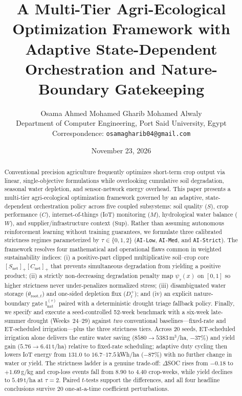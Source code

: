 \documentclass[11pt,a4paper]{article}
\title{\textbf{A Multi-Tier Agri-Ecological Optimization Framework with Adaptive State-Dependent Orchestration and Nature-Boundary Gatekeeping}}
\author{
  Osama Ahmed Mohamed Gharib Mohamed Alwaly\\
  \small Department of Computer Engineering, Port Said University, Egypt\\
  \small Correspondence: \texttt{osamagharib04@gmail.com}
}
\date{November 23, 2026}
\newcommand{\pos}[1]{\left[#1\right]_{+}}
\newcommand{\Inat}{\mathbb{I}_{\mathrm{nat}}}
\begin{document}
\maketitle

\begin{abstract}
Conventional precision agriculture frequently optimizes short-term crop output via linear, single-objective formulations while overlooking cumulative soil degradation, seasonal water depletion, and sensor-network energy overhead. This paper presents a multi-tier agri-ecological optimization framework governed by an adaptive, state-dependent orchestration policy across five coupled subsystems: soil quality ($S$), crop performance ($C$), internet-of-things (IoT) monitoring ($M$), hydrological water balance ($W$), and supplier/infrastructure context ($\mathrm{Sup}$). Rather than assuming autonomous reinforcement learning without training guarantees, we formulate three calibrated strictness regimes parameterized by $\tau \in \{0, 1, 2\}$ (\texttt{AI-Low}, \texttt{AI-Med}, and \texttt{AI-Strict}). The framework resolves four mathematical and operational flaws common in weighted sustainability indices: (i) a positive-part clipped multiplicative soil--crop core $\pos{S_{\mathrm{net}}}\pos{C_{\mathrm{net}}}$ that prevents simultaneous degradation from yielding a positive product; (ii) a strictly non-decreasing degradation penalty map $\psi_\tau(x)$ on $[0,1]$ so higher strictness never under-penalizes normalized stress; (iii) disambiguated water storage ($\theta_{\mathrm{root},t}$) and one-sided depletion flux ($D_t^+$); and (iv) an explicit nature-boundary gate $\Inat^{(\tau)}$ paired with a deterministic drought triage fallback policy. Finally, we specify and execute a seed-controlled 52-week benchmark with a six-week late-summer drought (Weeks~24--29) against \emph{two} conventional baselines---fixed-rate and ET-scheduled irrigation---plus the three strictness tiers. Across 20 seeds, ET-scheduled irrigation alone delivers the entire water saving ($8580 \to 5383$\,m$^3$/ha, $-37\%$) and yield gain ($5.76 \to 6.41$\,t/ha) relative to fixed-rate scheduling; adaptive duty cycling then lowers IoT energy from $131.0$ to $16.7$--$17.5$\,kWh/ha ($-87\%$) with no further change in water or yield. The strictness ladder is a genuine trade-off: $\Delta$SOC rises from $-0.18$ to $+1.69$\,g/kg and crop-loss events fall from $8.90$ to $4.40$ crop-weeks, while yield declines to $5.49$\,t/ha at $\tau=2$. Paired $t$-tests support the differences, and all four headline conclusions survive 20 one-at-a-time coefficient perturbations.
\end{abstract}
\end{document}
